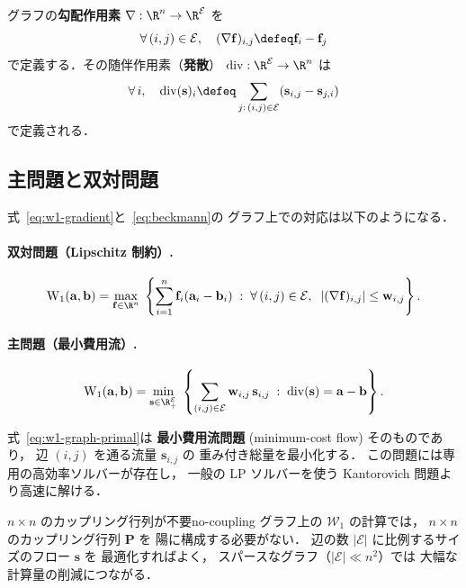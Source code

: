 グラフの\textbf{勾配作用素} $\nabla : \R^n \to \R^{\mathcal{E}}$ を
\[
  \forall\, (i, j) \in \mathcal{E}, \quad
  (\nabla \mathbf{f})_{i,j} \defeq \mathbf{f}_i - \mathbf{f}_j
\]
で定義する．その随伴作用素（\textbf{発散}）
$\mathrm{div} : \R^{\mathcal{E}} \to \R^n$ は
\[
  \forall\, i, \quad
  \mathrm{div}(\mathbf{s})_i \defeq
  \sum_{j:\, (i,j) \in \mathcal{E}} (\mathbf{s}_{i,j} - \mathbf{s}_{j,i})
\]
で定義される．

\subsection{主問題と双対問題}\label{subsec:w1-graph-formulation}

式~\eqref{eq:w1-gradient}と~\eqref{eq:beckmann}の
グラフ上での対応は以下のようになる．

\paragraph{双対問題（Lipschitz 制約）.}
\begin{equation}\label{eq:w1-graph-dual}
  \mathrm{W}_1(\mathbf{a}, \mathbf{b})
  = \max_{\mathbf{f} \in \R^n}\; \left\{
    \sum_{i=1}^n \mathbf{f}_i (\mathbf{a}_i - \mathbf{b}_i)
    \;:\; \forall\, (i,j) \in \mathcal{E},\;\;
    |(\nabla \mathbf{f})_{i,j}| \leq \mathbf{w}_{i,j}
  \right\}.
\end{equation}

\paragraph{主問題（最小費用流）.}
\begin{equation}\label{eq:w1-graph-primal}
  \mathrm{W}_1(\mathbf{a}, \mathbf{b})
  = \min_{\mathbf{s} \in \R^{\mathcal{E}}_+}\; \left\{
    \sum_{(i,j) \in \mathcal{E}}
    \mathbf{w}_{i,j}\, \mathbf{s}_{i,j}
    \;:\; \mathrm{div}(\mathbf{s}) = \mathbf{a} - \mathbf{b}
  \right\}.
\end{equation}

式~\eqref{eq:w1-graph-primal}は
\textbf{最小費用流問題} (minimum-cost flow) そのものであり，
辺 $(i,j)$ を通る流量 $\mathbf{s}_{i,j}$ の
重み付き総量を最小化する．
この問題には専用の高効率ソルバーが存在し，
一般の LP ソルバーを使う Kantorovich 問題より高速に解ける．

\begin{remark}{$n \times n$ のカップリング行列が不要}{no-coupling}
グラフ上の $\mathcal{W}_1$ の計算では，
$n \times n$ のカップリング行列 $\mathbf{P}$ を
陽に構成する必要がない．
辺の数 $|\mathcal{E}|$ に比例するサイズのフロー $\mathbf{s}$ を
最適化すればよく，
スパースなグラフ（$|\mathcal{E}| \ll n^2$）では
大幅な計算量の削減につながる．
\end{remark}

